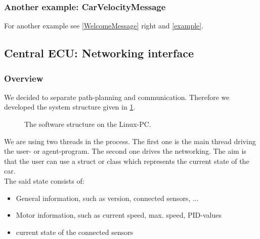 \subsubsection{Another example: CarVelocityMessage}

For another example see \ref{WelcomeMessage} right and \ref{example}.

\subsection{Central ECU: Networking interface}

\subsubsection{Overview}

We decided to separate path-planning and communication. Therefore we developed the system structure given in \ref{linuxPC}.

\begin{figure}[p]
	\caption{The software structure on the Linux-PC.} \label{linuxPC}
\end{figure}

We are using two threads in the process. The first one is the main thread driving the user- or agent-program. The second one drives the networking. The aim is that the user can use a struct or class which represents the current state of the car.\\

The said state consists of:
\begin{itemize}
	\item General information, such as version, connected sensors, ...
	\item Motor information, such as current speed, max. speed, PID-values
	\item current state of the connected sensors
\end{itemize}

